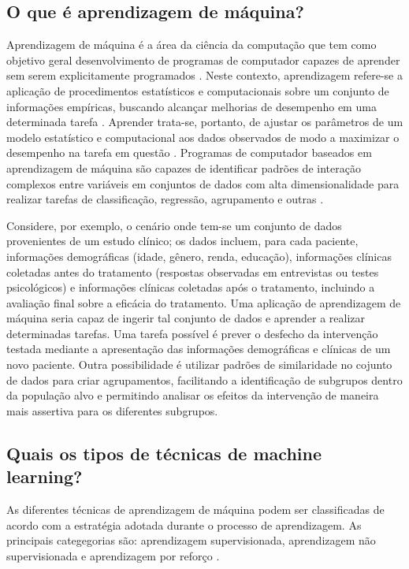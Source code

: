 \subsection{O que é aprendizagem de máquina?}

Aprendizagem de máquina é a área da ciência da computação que tem como objetivo geral desenvolvimento
de programas de computador capazes de aprender sem serem explicitamente programados \cite{Bi2019, Theobald2021}.
Neste contexto, aprendizagem refere-se a aplicação de procedimentos estatísticos e computacionais sobre um conjunto
de informações empíricas, buscando alcançar melhorias de desempenho em uma determinada tarefa \cite{Theobald2021}.
Aprender trata-se, portanto, de ajustar os parâmetros de um modelo estatístico e computacional aos dados observados
de modo a maximizar o desempenho na tarefa em questão \cite{Bi2019}.
Programas de computador baseados em aprendizagem de máquina são capazes de identificar padrões de interação complexos
entre variáveis em conjuntos de dados com alta dimensionalidade para realizar tarefas de classificação, regressão, agrupamento
e outras \cite{Theobald2021}.

Considere, por exemplo, o cenário onde tem-se um conjunto de dados provenientes de um estudo clínico; os dados
incluem, para cada paciente, informações demográficas (idade, gênero, renda, educação), informações clínicas
coletadas antes do tratamento (respostas observadas em entrevistas ou testes psicológicos) e informações clínicas
coletadas após o tratamento, incluindo a avaliação final sobre a eficácia do tratamento. Uma aplicação de aprendizagem de
máquina seria capaz de ingerir tal conjunto de dados e aprender a realizar determinadas tarefas. Uma tarefa possível
é prever o desfecho da intervenção testada mediante a apresentação das informações demográficas e clínicas de um
novo paciente. Outra possibilidade é utilizar padrões de similaridade no cojunto de dados para criar agrupamentos,
facilitando a identificação de subgrupos dentro da população alvo e permitindo analisar os efeitos da intervenção
de maneira mais assertiva para os diferentes subgrupos.

\subsection{Quais os tipos de técnicas de machine learning?}
As diferentes técnicas de aprendizagem de máquina podem ser classificadas de acordo com a estratégia adotada
durante o processo de aprendizagem. As principais categegorias são: aprendizagem supervisionada, aprendizagem não
supervisionada e aprendizagem por reforço \cite{Bi2019}.

